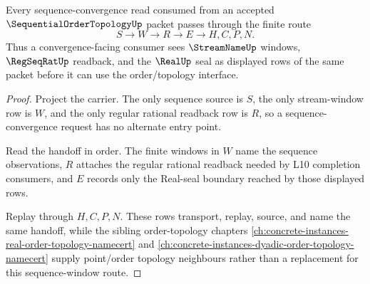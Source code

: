 \begin{theorem}
\label{thm:sequential-order-topology-stream-handoff}
Every sequence-convergence read consumed from an accepted $\SequentialOrderTopologyUp$ packet passes through the finite route
$$
S\longrightarrow W\longrightarrow R\longrightarrow E\longrightarrow H,C,P,N .
$$
Thus a convergence-facing consumer sees $\StreamNameUp$ windows, $\RegSeqRatUp$ readback, and the $\RealUp$ seal as displayed rows of the same packet before it can use the order/topology interface.
\end{theorem}
\begin{proof}
Project the carrier. The only sequence source is $S$, the only stream-window row is $W$, and the only regular rational readback row is $R$, so a sequence-convergence request has no alternate entry point.

Read the handoff in order. The finite windows in $W$ name the sequence observations, $R$ attaches the regular rational readback needed by L10 completion consumers, and $E$ records only the Real-seal boundary reached by those displayed rows.

Replay through $H,C,P,N$. These rows transport, replay, source, and name the same handoff, while the sibling order-topology chapters \autoref{ch:concrete-instances-real-order-topology-namecert} and \autoref{ch:concrete-instances-dyadic-order-topology-namecert} supply point/order topology neighbours rather than a replacement for this sequence-window route.
\end{proof}


\begin{closurestatus}{\SequentialOrderTopologyUp}
  \theoryclosure{\seedClosure}
  \formalstatus{\unformalizedV}
\end{closurestatus}
